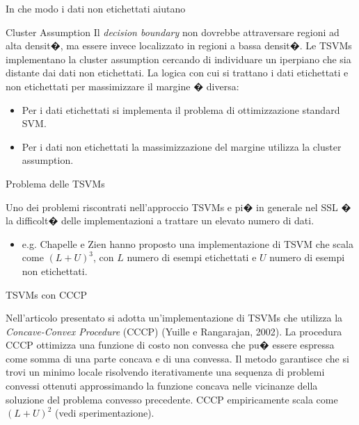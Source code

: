 \documentclass[mathserif]{beamer}
\begin{document}
\begin{frame}{In che modo i dati non etichettati aiutano}{}

\begin{block}{\alert{Cluster Assumption}} 
Il \textit{decision boundary} non dovrebbe attraversare regioni ad alta densit�, ma essere invece localizzato in regioni a bassa densit�.
Le TSVMs implementano la cluster assumption cercando di individuare un iperpiano che sia distante dai dati non etichettati. La logica con cui si trattano i dati etichettati e non etichettati per massimizzare il margine � diversa:

\begin{itemize}
	\item<1-> Per i dati etichettati si implementa il problema di ottimizzazione standard SVM. 
	\item<1-> Per i dati non etichettati la massimizzazione del margine utilizza la cluster assumption.
\end{itemize}
\end{block}


\end{frame}

\begin{frame}{Problema delle TSVMs}
\begin{block}{}
Uno dei problemi riscontrati nell'approccio TSVMs e pi� in generale nel SSL � la difficolt� delle implementazioni a trattare un elevato numero di dati.
\begin{itemize}
	\item<1->  e.g. Chapelle e Zien hanno proposto una implementazione di TSVM che scala come $(L+U)^3$, con $L$ numero di esempi etichettati e $U$ numero di esempi non etichettati.
\end{itemize}
\end{block}
\end{frame}

\begin{frame}{TSVMs con CCCP}
\begin{block}{}
Nell'articolo presentato si adotta un'implementazione di TSVMs che utilizza la \textit{Concave-Convex Procedure} (CCCP) (Yuille e Rangarajan, 2002). La procedura CCCP ottimizza una funzione di costo non convessa che pu� essere espressa come somma di una parte concava e di una convessa. Il metodo garantisce che si trovi un minimo locale risolvendo iterativamente una sequenza di problemi convessi ottenuti approssimando la funzione concava nelle vicinanze della soluzione del problema convesso precedente. CCCP empiricamente scala come \alert{$(L+U)^2$ }(vedi sperimentazione).
\end{block}
\end{frame}
\end{document}

